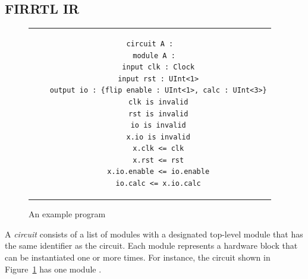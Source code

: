 
 


\subsection{FIRRTL IR}
 
\begin{figure}[t]
\vspace{-2mm}
\centering
\begin{tabular}{c}
\begin{lstlisting}
circuit A :
  module A :
    input clk : Clock
    input rst : UInt<1>
    output io : {flip enable : UInt<1>, calc : UInt<3>}
    clk is invalid
    rst is invalid
    io is invalid
    x.io is invalid
    x.clk <= clk
    x.rst <= rst
    x.io.enable <= io.enable
    io.calc <= x.io.calc
\end{lstlisting}
\end{tabular}\vspace{-2mm}
\caption{An example {\firrtl} program \label{fig:example_sect2}}
\vspace{-5mm}
\end{figure}

%

A {\firrtl} \emph{circuit} consists of a list of modules with a designated top-level module that has the same identifier as the circuit.
Each module represents a hardware block that can
be instantiated one or more times.
%
For instance, the {\firrtl}  circuit  shown in Figure~\ref{fig:example_sect2} has one module .

